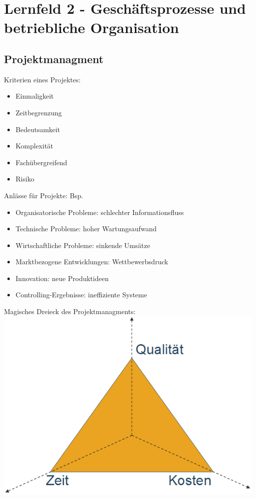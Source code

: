 \section{Lernfeld 2 - Geschäftsprozesse und betriebliche Organisation}

\subsection{Projektmanagment}

Kriterien eines Projektes:
\begin{itemize}
	\item Einmaligkeit
	\item Zeitbegrenzung
	\item Bedeutsamkeit
	\item Komplexität
	\item Fachübergreifend
	\item Risiko
\end{itemize}

Anlässe für Projekte: Bsp.
\begin{itemize}
	\item Organisatorische Probleme: schlechter Informationsfluss
	\item Technische Probleme: hoher Wartungsaufwand
	\item Wirtschaftliche Probleme: sinkende Umsätze
	\item Marktbezogene Entwicklungen: Wettbewerbsdruck
	\item Innovation: neue Produktideen
	\item Controlling-Ergebnisse: ineffiziente Systeme
\end{itemize}

Magisches Dreieck des Projektmanagments:\\
\includegraphics[scale=0.5]{pictures/lf02-pic/lf02-projekt-dreieck.png}

